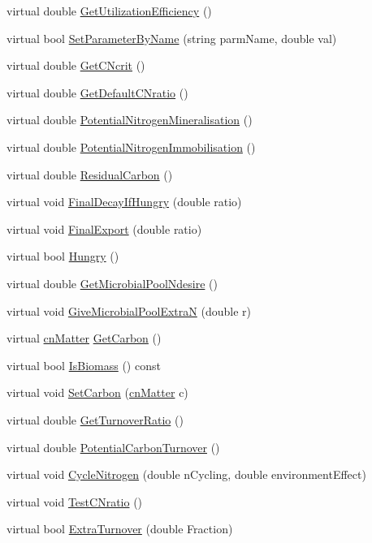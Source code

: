 \begin{DoxyCompactItemize}
virtual double \hyperlink{classbio_matter_a47e39d55d2b9b4ad92a9f82fc7ad4cf7}{GetUtilizationEfficiency} ()
\item 
virtual bool \hyperlink{classbio_matter_a1ade505ad2c176aedbcf4b3e937eb412}{SetParameterByName} (string parmName, double val)
\item 
virtual double \hyperlink{classbio_matter_ac8e514d722c9605efcf653fdc46b1d65}{GetCNcrit} ()
\item 
virtual double \hyperlink{classbio_matter_aee0b5cbabdff3103df0fb634c131a8a1}{GetDefaultCNratio} ()
\item 
virtual double \hyperlink{classbio_matter_a10072a4f5ed6d3462c9872e4836f4adc}{PotentialNitrogenMineralisation} ()
\item 
virtual double \hyperlink{classbio_matter_a313cea693a2fb094b2e9bf591439ad3a}{PotentialNitrogenImmobilisation} ()
\item 
virtual double \hyperlink{classbio_matter_aa432cb13da2d6c6a800e45bfcad5654b}{ResidualCarbon} ()
\item 
virtual void \hyperlink{classbio_matter_adbafa5aac0c673f8659adec82a4cc99f}{FinalDecayIfHungry} (double ratio)
\item 
virtual void \hyperlink{classbio_matter_ae738d8197ededa18e73f8640ce52d1ab}{FinalExport} (double ratio)
\item 
virtual bool \hyperlink{classbio_matter_a35a43ac5963539bf7a22c28084ae4ff6}{Hungry} ()
\item 
virtual double \hyperlink{classbio_matter_ab581ae32f84e6396b6c1057f70989333}{GetMicrobialPoolNdesire} ()
\item 
virtual void \hyperlink{classbio_matter_aa3c39ebe46dac6e354b127c53bf94cb3}{GiveMicrobialPoolExtraN} (double r)
\item 
virtual \hyperlink{classcn_matter}{cnMatter} \hyperlink{classbio_matter_a5e053f03d4be2b04f8e5f633f4181af1}{GetCarbon} ()
\item 
virtual bool \hyperlink{classbio_matter_a0d7bb17bd17f03b79294753f8ffdd394}{IsBiomass} () const 
\item 
virtual void \hyperlink{classbio_matter_ab5e10fda0c8137df57be8baade98d27c}{SetCarbon} (\hyperlink{classcn_matter}{cnMatter} c)
\item 
virtual double \hyperlink{classbio_matter_ab2f5c9de1f2d2e7df6a98a51459a2175}{GetTurnoverRatio} ()
\item 
virtual double \hyperlink{classbio_matter_a3aed8f9e9d66c1c12491ace5f15439f5}{PotentialCarbonTurnover} ()
\item 
virtual void \hyperlink{classbio_matter_a9257d95bfb49081c8dc1f2515f1a9d13}{CycleNitrogen} (double nCycling, double environmentEffect)
\item 
virtual void \hyperlink{classbio_matter_ac21201df3eaeb3d52544b1fa0d917143}{TestCNratio} ()
\item 
virtual bool \hyperlink{classbio_matter_aaa093e840d976d780d9601562709c044}{ExtraTurnover} (double Fraction)
\end{DoxyCompactItemize}
